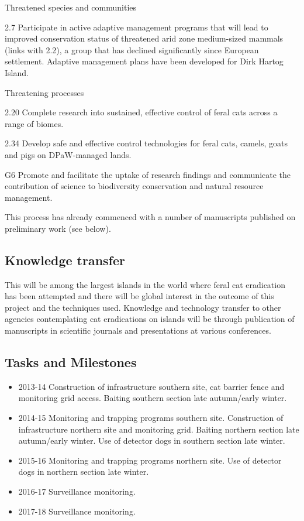 \documentclass[version=last,
    paper=a4,                               %
    10pt,                                   %
    dvipsnames,
    oneside,                              %
    headings=openany,                       %
    open=any,
    BCOR=7mm,                               %
    DIV=15,     %
]{scrbook}
\begin{document}
Threatened species and communities

2.7 Participate in active adaptive management programs that will lead to
improved conservation status of threatened arid zone medium-sized
mammals (links with 2.2), a group that has declined significantly since
European settlement. Adaptive management plans have been developed for
Dirk Hartog Island.

Threatening processes

2.20 Complete research into sustained, effective control of feral cats
across a range of biomes.

2.34 Develop safe and effective control technologies for feral cats,
camels, goats and pigs on DPaW-managed lands.

G6 Promote and facilitate the uptake of research findings and
communicate the contribution of science to biodiversity conservation and
natural resource management.

This process has already commenced with a number of manuscripts
published on preliminary work (see below).




\subsection*{Knowledge transfer}

This will be among the largest islands in the world where feral cat
eradication has been attempted and there will be global interest in the
outcome of this project and the techniques used. Knowledge and
technology transfer to other agencies contemplating cat eradications on
islands will be through publication of manuscripts in scientific
journals and presentations at various conferences.




\subsection*{Tasks and Milestones}

\begin{itemize}
\itemsep1pt\parskip0pt
\item
  2013-14 Construction of infrastructure southern site, cat barrier
  fence and monitoring grid access. Baiting southern section late
  autumn/early winter.
\item
  2014-15 Monitoring and trapping programs southern site. Construction
  of infrastructure northern site and monitoring grid. Baiting northern
  section late autumn/early winter. Use of detector dogs in southern
  section late winter.
\item
  2015-16 Monitoring and trapping programs northern site. Use of
  detector dogs in northern section late winter.
\item
  2016-17 Surveillance monitoring.
\item
  2017-18 Surveillance monitoring.
\end{itemize}
\end{document}
